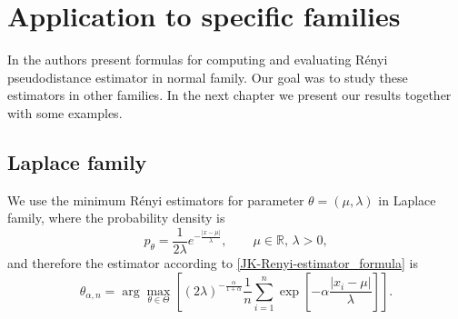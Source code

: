 {\section{Application to specific families}

In \cite{Vajda2009} the authors present formulas for computing and evaluating R\'{e}nyi pseudodistance estimator in normal family. Our goal was to study these estimators in other families. In the next chapter we present our results together with some examples.


\subsection*{Laplace family}
We use the minimum R\'{e}nyi estimators for parameter $\theta = (\mu,\lambda)$ in Laplace family, where the probability density is
\begin{equation}
	p_\theta = \frac{1}{2\lambda} e^{-\frac{|x-\mu|}{\lambda}}, \qquad \mu\in \mathbb{R},\, \lambda>0,
\end{equation}
and therefore the estimator according to \eqref{JK-Renyi-estimator_formula} is
\begin{equation}
	\theta_{\alpha,n} = \arg \max_{\theta \in \Theta} \left[ (2\lambda)^{-\frac{\alpha}{1+\alpha}} \frac{1}{n} \sum_{i=1}^n \exp \left[-\alpha\frac{|x_i-\mu|}{\lambda} \right] \right].
\end{equation}

}
